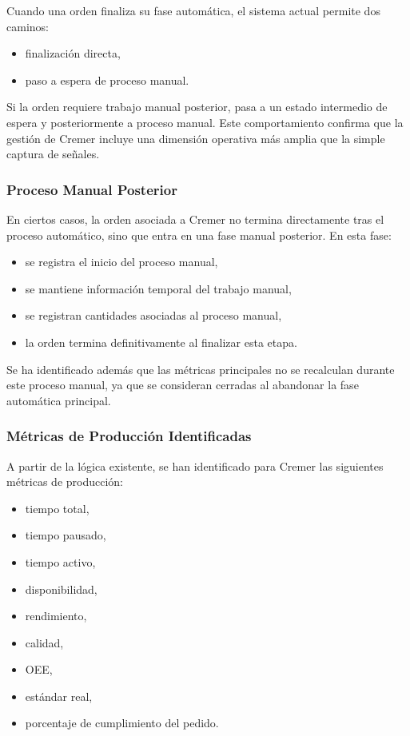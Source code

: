 Cuando una orden finaliza su fase automática, el sistema actual permite dos caminos:

\begin{itemize}
    \item finalización directa,
    \item paso a espera de proceso manual.
\end{itemize}

Si la orden requiere trabajo manual posterior, pasa a un estado intermedio de espera y posteriormente a proceso manual. Este comportamiento confirma que la gestión de Cremer incluye una dimensión operativa más amplia que la simple captura de señales.

\subsubsection{Proceso Manual Posterior}

En ciertos casos, la orden asociada a Cremer no termina directamente tras el proceso automático, sino que entra en una fase manual posterior. En esta fase:

\begin{itemize}
    \item se registra el inicio del proceso manual,
    \item se mantiene información temporal del trabajo manual,
    \item se registran cantidades asociadas al proceso manual,
    \item la orden termina definitivamente al finalizar esta etapa.
\end{itemize}

Se ha identificado además que las métricas principales no se recalculan durante este proceso manual, ya que se consideran cerradas al abandonar la fase automática principal.

\subsubsection{Métricas de Producción Identificadas}

A partir de la lógica existente, se han identificado para Cremer las siguientes métricas de producción:

\begin{itemize}
    \item tiempo total,
    \item tiempo pausado,
    \item tiempo activo,
    \item disponibilidad,
    \item rendimiento,
    \item calidad,
    \item OEE,
    \item estándar real,
    \item porcentaje de cumplimiento del pedido.
\end{itemize}


